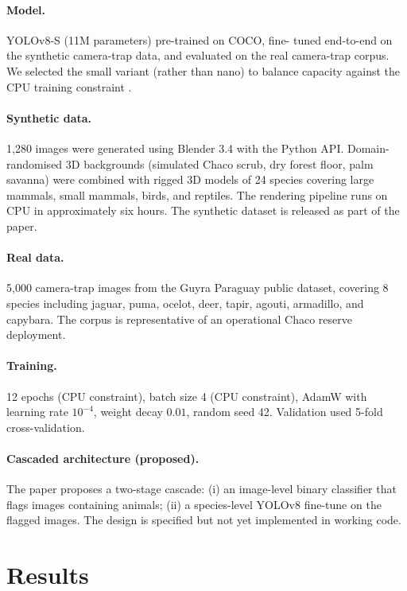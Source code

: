 \paragraph{Model.} YOLOv8-S (11M parameters) pre-trained on COCO, fine-
tuned end-to-end on the synthetic camera-trap data, and evaluated on
the real camera-trap corpus. We selected the small variant (rather than
nano) to balance capacity against the CPU training constraint
\citep{yolov8}.

\paragraph{Synthetic data.} 1{,}280 images were generated using
Blender 3.4 with the Python API. Domain-randomised 3D backgrounds
(simulated Chaco scrub, dry forest floor, palm savanna) were combined
with rigged 3D models of 24 species covering large mammals, small
mammals, birds, and reptiles. The rendering pipeline runs on CPU in
approximately six hours. The synthetic dataset is released as part of
the paper.

\paragraph{Real data.} 5{,}000 camera-trap images from the Guyra
Paraguay public dataset, covering 8 species including jaguar, puma,
ocelot, deer, tapir, agouti, armadillo, and capybara. The corpus is
representative of an operational Chaco reserve deployment.

\paragraph{Training.} 12 epochs (CPU constraint), batch size 4
(CPU constraint), AdamW with learning rate $10^{-4}$, weight decay
$0.01$, random seed 42. Validation used 5-fold cross-validation.

\paragraph{Cascaded architecture (proposed).} The paper proposes a
two-stage cascade: (i) an image-level binary classifier that flags
images containing animals; (ii) a species-level YOLOv8 fine-tune on the
flagged images. The design is specified but not yet implemented in
working code.

\section{Results}
\label{sec:kai-results}

